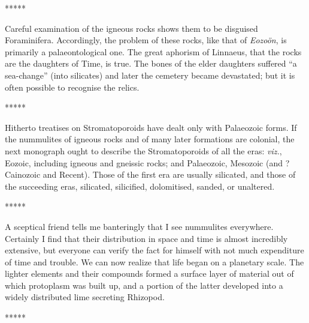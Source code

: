 \documentclass[a4paper, 12pt, oneside]{article}
\begin{document}
\centerline{*\hspace{15mm}*\hspace{15mm}*\hspace{15mm}*\hspace{15mm}*}
\bigskip

Careful examination of the igneous rocks shows them to be disguised Foraminifera. Accordingly, the problem of these rocks, like that of \emph{Eozoön}, is primarily a palaeontological one. The great aphorism of Linnaeus, that the rocks are the daughters of Time, is true. The bones of the elder daughters suffered ``a sea-change'' (into silicates) and later the cemetery became devastated; but it is often possible to recognise the relics.

\centerline{*\hspace{15mm}*\hspace{15mm}*\hspace{15mm}*\hspace{15mm}*}
\bigskip

Hitherto treatises on Stromatoporoids have dealt only with Palaeozoic forms. If the nummulites of igneous rocks and of many later formations are colonial, the next monograph ought to describe the Stromatoporoids of all the eras: \emph{viz.}, Eozoic, including igneous and gneissic rocks; and Palaeozoic, Mesozoic (and ? Cainozoic and Recent). Those of the first era are usually silicated, and those of the succeeding eras, silicated, silicified, dolomitised, sanded, or unaltered.

\centerline{*\hspace{15mm}*\hspace{15mm}*\hspace{15mm}*\hspace{15mm}*}
\bigskip

A sceptical friend tells me banteringly that I see nummulites everywhere. Certainly I find that their distribution in space and time is almost incredibly extensive, but everyone can verify the fact for himself with not much expenditure of time and trouble. We can now realize that life began on a planetary scale. The lighter elements and their compounds formed a surface layer of material out of which protoplasm was built up, and a portion of the latter developed into a widely distributed lime secreting Rhizopod.

\centerline{*\hspace{15mm}*\hspace{15mm}*\hspace{15mm}*\hspace{15mm}*}
\bigskip
\end{document}
